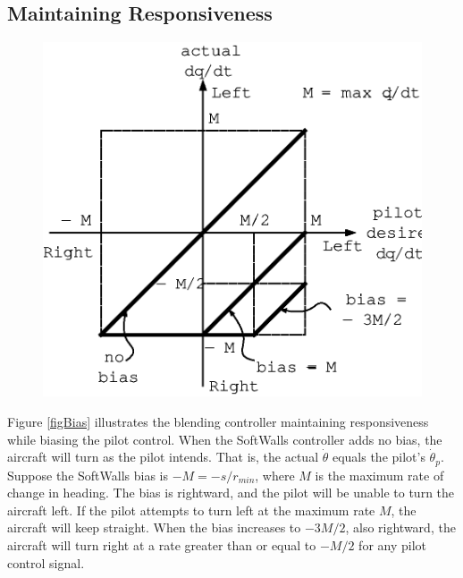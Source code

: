 \documentclass[11pt]{article}
\begin{document}

\subsection{Maintaining Responsiveness}

\begin{figure}[btp]
\centering
\includegraphics{bias.eps}
\end{figure}

Figure \ref{figBias} illustrates the blending controller maintaining
responsiveness while biasing the pilot control.  When the SoftWalls
controller adds no bias, the aircraft will turn as the pilot
intends. That is, the actual $\dot{\theta}$ equals the pilot's
$\dot{\theta}_{p}$.  Suppose the SoftWalls bias is $-M = -s/r_{min}$,
where $M$ is the maximum rate of change in heading.  The bias is
rightward, and the pilot will be unable to turn the aircraft left.
If the pilot attempts to turn left at the maximum rate $M$, the
aircraft will keep straight.  When the bias increases to $-3M/2$, also
rightward, the aircraft will turn right at a rate greater than or
equal to $-M/2$ for any pilot control signal.
\end{document}

